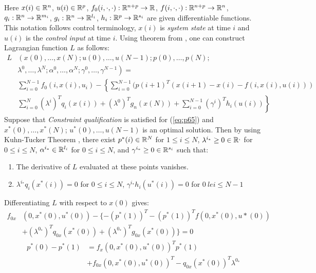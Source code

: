 \noindent Here $x(i)\in\mathbb{R}^n$, $u(i) \in \mathbb{R}^p$, $f_0(i,\cdot,\cdot): \mathbb{R}^{n+p}\to \mathbb{R}$, $f(i,\cdot,\cdot):\mathbb{R}^{n+p}\to\mathbb{R}^n$, $q_i: \mathbb{R}^n\to\mathbb{R}^{m_i}$, $g_i:\mathbb{R}^n\to\mathbb{R}^{l_i}$, $h_i: \mathbb{R}^p\to\mathbb{R}^{s_i}$ are given differentiable functions. This notation follows control terminology, $x(i)$ is \textit{system state} at time $i$ and $u(i)$ is the \textit{control input} at time $i$.
Using theorem from \cite{wonham1968matrix}, one can construct Lagrangian function $L$ as follows:
\begin{equation}
    \begin{split}
    L&\left( x(0),\dots,x(N);u(0),\dots,u(N-1);p(0),\dots,p(N); \right. \\
    &\left. \lambda^0,\dots,\lambda^N;\alpha^0,\dots,\alpha^N;\gamma^0,\dots,\gamma^{N-1} \right) =\\
    &\sum_{i=0}^{N-1} f_0(i,x(i),u_i) - \left\{ \sum_{i=0}^{N-1} (p(i+1)^T (x(i+1)-x(i) - f(i,x(i),u(i))) \right. \\
    &\left. \sum_{i=0}^N (\lambda^i)^T q_i(x(i)) + (\lambda^0)^T g_n(x(N)) + \sum_{i=0}^{N-1} (\gamma^i)^T h_i(u(i)) \right\}
    \end{split}
\end{equation}
\noindent Suppose that \textit{Constraint qualification} is satisfied for (\ref{eq:p65}) and $x^*(0),\dots,x^*(N)$; $u^*(0),\dots,u(N-1)$ is an optimal solution. Then by using Kuhn-Tucker Theorem \cite{kampas2005tricks}, there exist $p^*(i)\in\mathbb{R}^N$ for $1\le i \le N$, $\lambda^{i_*} \ge 0 \in \mathbb{R}^,$ for $0\le i \le N$, $\alpha^{i_*}\in \mathbb{R}^{l_i}$ for $0\le i \le N$, and $\gamma^{i_*} \ge 0 \in \mathbb{R}^{s_i}$ such that:
\begin{enumerate}
\item The derivative of $L$ evaluated at these points vanishes.
\item $\lambda^{i_*}q_i(x^*(i))=0$ for $0\le i \le N$, $\gamma^{i_*}h_i(u^*(i))=0$ for $0 \ le i \le N-1$
\end{enumerate}
\newpage\noindent Differentiating $L$ with respect to $x(0)$ gives:
\begin{equation}\label{eq:p66a}
    \begin{split}
    f_{0x}&(0,x^*(0),u^*(0)) - \{-(p^*(1))^T-(p^*(1))^T f(0,x^*(0),u*(0))\\
    & + (\lambda^{0_*})^T q_{0x}(x^*(0)) + (\lambda^{0_*})^T g_{0x}(x^*(0))\} = 0
    \end{split}
\end{equation}
\begin{equation}\label{eq:p66b}
    \begin{split}
    p^*(0) - p^*(1) &= f_x(0,x^*(0),u^*(0))^T p^*(1)\\
    &+ f_{0x}(0,x^*(0),u^*(0))^T - q_{0x}(x^*(0))^T \lambda^{0_*}
    \end{split}
\end{equation}
